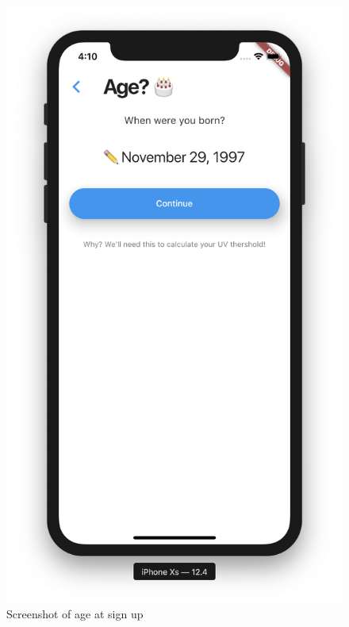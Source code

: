 \documentclass[12pt,openany,a4paper]{book}
\begin{document}
\begin{figure}[h]
	\centering\includegraphics[width=\textwidth]{AgeScreen.png}
	\caption{Screenshot of age at sign up}
	\label{fig:age_screen}
	\end{figure}
\end{document}
